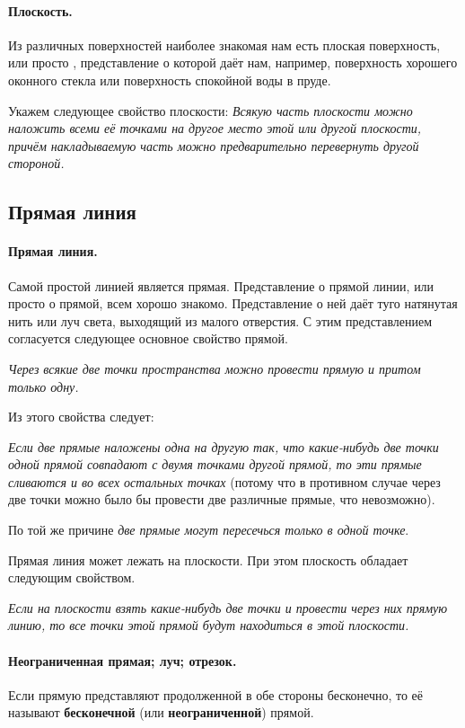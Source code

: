 \paragraph{Плоскость.}\label{1938/3}
Из различных поверхностей наиболее знакомая нам есть плоская поверхность, или просто , представление о которой даёт нам, например, поверхность хорошего оконного стекла или поверхность спокойной воды в пруде.

Укажем следующее свойство плоскости:
\textit{Всякую часть плоскости можно наложить всеми её точками на другое место этой или другой плоскости, причём накладываемую часть можно предварительно перевернуть другой стороной.}

\subsection*{Прямая линия}

\paragraph{Прямая линия.}\label{1938/4}
Самой простой линией является прямая.
Представление о прямой линии, или просто о прямой, всем хорошо знакомо.
Представление о ней даёт туго натянутая нить или луч света, выходящий из малого отверстия.
С этим представлением согласуется следующее основное свойство прямой.

\textit{Через всякие две точки пространства можно провести прямую и притом только одну.}

Из этого свойства следует:

\textit{Если две прямые наложены одна на другую так, что какие-нибудь две точки одной прямой совпадают с двумя точками другой прямой, то эти прямые сливаются и во всех остальных точках} (потому что в противном случае через две точки можно было бы провести две различные прямые, что невозможно).

По той же причине \textit{две прямые могут пересечься только в одной точке}.

Прямая линия может лежать на плоскости.
При этом плоскость обладает следующим свойством.

\textit{Если на плоскости взять какие-нибудь две точки и провести через них прямую линию, то все точки этой прямой будут находиться в этой плоскости.}

\paragraph{Неограниченная прямая; луч; отрезок.}\label{1938/5}
Если прямую представляют продолженной в обе стороны бесконечно, то её называют \textbf{бесконечной} (или \textbf{неограниченной}) прямой.

